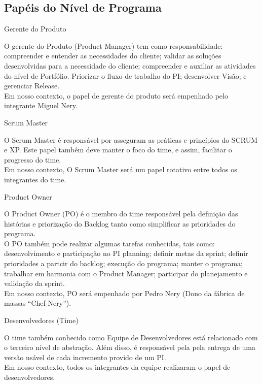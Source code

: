 {\large{\subsection {Papéis do Nível de Programa\\} } }
\begin{itemize}

{
	\large{\item {Gerente do Produto} }

	\tab O gerente do Produto (Product Manager)  tem como responsabilidade: compreender e entender as necessidades do cliente; validar as soluções desenvolvidas para a necessidade do cliente;  compreender e auxiliar as atividades do nível de Portfólio. Priorizar o fluxo de trabalho do PI; desenvolver Visão; e gerenciar Release. \\
	\tab Em nosso contexto, o papel de gerente do produto será empenhado pelo integrante Miguel Nery. \\
 }

{
	\large{\item {Scrum Master\\} }
	\tab O Scrum Master é responsável por asseguram as práticas e princípios do SCRUM e XP. Este papel também deve manter o foco do time, e assim, facilitar o progresso do time. \\
	\tab Em nosso contexto, O Scrum Master será um papel rotativo entre todos os integrantes do time. \\
}


{
	\large{\item {Product Owner} }

	\tab O Product Owner (PO) é o membro do time responsável pela definição das histórias e priorização do Backlog tanto como simplificar as prioridades do programa. \\
	\tab O PO também pode realizar algumas tarefas conhecidas, tais como: desenvolvimento e participação no PI planning; definir metas da sprint; definir prioridades  a partcir do backlog; execução do programa; manter o programa; trabalhar em harmonia com o Product Manager; participar do planejamento e validação da sprint. \\
	\tab Em nosso contexto, PO será empenhado por Pedro Nery (Dono da fábrica de massas “Chef Nery”). \\
}

{
	\large{\item {Desenvolvedores (Time)} }

	\tab O time também conhecido como Equipe de Desenvolvedores está relacionado com o terceiro nível de abstração. Além disso, é responsável pela pela entrega de uma versão usável de cada incremento provido de um PI. \\
	\tab Em nosso contexto, todos os integrantes da equipe realizaram o papel de desenvolvedores. \\

}

\end{itemize}
